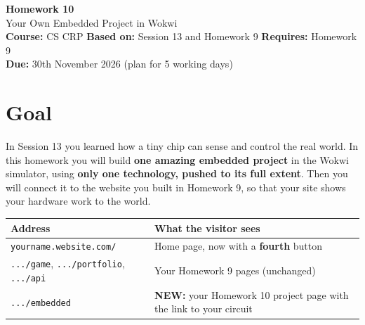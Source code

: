 \documentclass[11pt,a4paper]{article}
\begin{document}
\begin{center}
{\Huge\bfseries\color{hc} Homework 10}\\[6pt]
{\Large Your Own Embedded Project in Wokwi}\\[8pt]
\textbf{Course:} CS CRP \quad \textbf{Based on:} Session 13 and Homework 9 \quad \textbf{Requires:} Homework 9\\
\textbf{Due:} 30th November 2026 \quad (plan for 5 working days)
\end{center}

\section*{Goal}
In Session 13 you learned how a tiny chip can sense and control the real world. In this homework you will build \textbf{one amazing embedded project} in the Wokwi simulator, using \textbf{only one technology, pushed to its full extent}. Then you will connect it to the website you built in Homework 9, so that your site shows your hardware work to the world.

\begin{center}
\begin{tabularx}{\textwidth}{lX}
\toprule
\textbf{Address} & \textbf{What the visitor sees}\\
\midrule
\texttt{yourname.website.com/} & Home page, now with a \textbf{fourth} button\\
\texttt{.../game}, \texttt{.../portfolio}, \texttt{.../api} & Your Homework 9 pages (unchanged)\\
\texttt{.../embedded} & \textbf{NEW:} your Homework 10 project page with the link to your circuit\\
\bottomrule
\end{tabularx}
\end{center}
\end{document}
